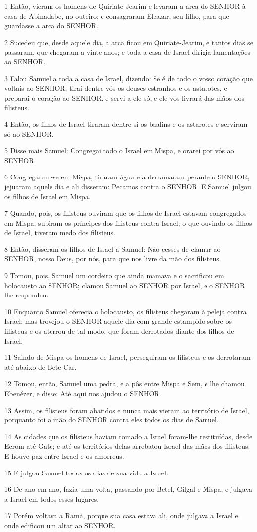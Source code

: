 \par 1 Então, vieram os homens de Quiriate-Jearim e levaram a arca do SENHOR à casa de Abinadabe, no outeiro; e consagraram Eleazar, seu filho, para que guardasse a arca do SENHOR.
\par 2 Sucedeu que, desde aquele dia, a arca ficou em Quiriate-Jearim, e tantos dias se passaram, que chegaram a vinte anos; e toda a casa de Israel dirigia lamentações ao SENHOR.
\par 3 Falou Samuel a toda a casa de Israel, dizendo: Se é de todo o vosso coração que voltais ao SENHOR, tirai dentre vós os deuses estranhos e os astarotes, e preparai o coração ao SENHOR, e servi a ele só, e ele vos livrará das mãos dos filisteus.
\par 4 Então, os filhos de Israel tiraram dentre si os baalins e os astarotes e serviram só ao SENHOR.
\par 5 Disse mais Samuel: Congregai todo o Israel em Mispa, e orarei por vós ao SENHOR.
\par 6 Congregaram-se em Mispa, tiraram água e a derramaram perante o SENHOR; jejuaram aquele dia e ali disseram: Pecamos contra o SENHOR. E Samuel julgou os filhos de Israel em Mispa.
\par 7 Quando, pois, os filisteus ouviram que os filhos de Israel estavam congregados em Mispa, subiram os príncipes dos filisteus contra Israel; o que ouvindo os filhos de Israel, tiveram medo dos filisteus.
\par 8 Então, disseram os filhos de Israel a Samuel: Não cesses de clamar ao SENHOR, nosso Deus, por nós, para que nos livre da mão dos filisteus.
\par 9 Tomou, pois, Samuel um cordeiro que ainda mamava e o sacrificou em holocausto ao SENHOR; clamou Samuel ao SENHOR por Israel, e o SENHOR lhe respondeu.
\par 10 Enquanto Samuel oferecia o holocausto, os filisteus chegaram à peleja contra Israel; mas trovejou o SENHOR aquele dia com grande estampido sobre os filisteus e os aterrou de tal modo, que foram derrotados diante dos filhos de Israel.
\par 11 Saindo de Mispa os homens de Israel, perseguiram os filisteus e os derrotaram até abaixo de Bete-Car.
\par 12 Tomou, então, Samuel uma pedra, e a pôs entre Mispa e Sem, e lhe chamou Ebenézer, e disse: Até aqui nos ajudou o SENHOR.
\par 13 Assim, os filisteus foram abatidos e nunca mais vieram ao território de Israel, porquanto foi a mão do SENHOR contra eles todos os dias de Samuel.
\par 14 As cidades que os filisteus haviam tomado a Israel foram-lhe restituídas, desde Ecrom até Gate; e até os territórios delas arrebatou Israel das mãos dos filisteus. E houve paz entre Israel e os amorreus.
\par 15 E julgou Samuel todos os dias de sua vida a Israel.
\par 16 De ano em ano, fazia uma volta, passando por Betel, Gilgal e Mispa; e julgava a Israel em todos esses lugares.
\par 17 Porém voltava a Ramá, porque sua casa estava ali, onde julgava a Israel e onde edificou um altar ao SENHOR.

